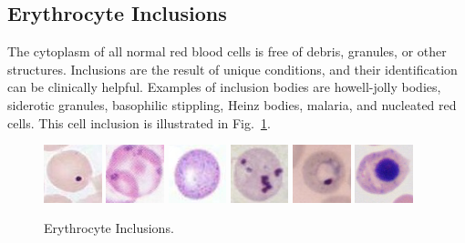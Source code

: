 \documentclass[final,a4paper,12pt,english]{UnicaPhdThesis3}
\begin{document}
{\subsection{Erythrocyte Inclusions}
The cytoplasm of all normal red blood cells is free of debris, granules, or other structures. Inclusions are the result of unique conditions, and their identification can be clinically helpful. Examples of inclusion bodies are howell-jolly bodies, siderotic granules, basophilic stippling, Heinz bodies, malaria, and nucleated red cells. This cell inclusion is illustrated in Fig.~\ref{fig:Inclusions}.

\begin{figure}[!htbp]
\centering
\includegraphics[width=0.15\textwidth]{images/Howell}
\includegraphics[width=0.15\textwidth]{images/siderotic}
\includegraphics[width=0.15\textwidth]{images/basophilic}
\includegraphics[width=0.15\textwidth]{images/Heinz}
\includegraphics[width=0.15\textwidth]{images/Malaria}
\includegraphics[width=0.15\textwidth]{images/nucleated}
\caption{\label{fig:Inclusions} Erythrocyte Inclusions.}
\end{figure}

}
\end{document}
